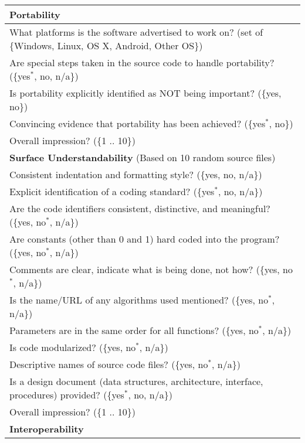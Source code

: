 \begin{longtable}{p{16cm}}
  \midrule
  \textbf{Portability}\\
  \midrule

  What platforms is the software advertised to work on?
  (set of \{Windows, Linux, OS X, Android, Other OS\})\\
  Are special steps taken in the source code to handle portability? (\{yes$^*$,
  no, n/a\}) \\
  Is portability explicitly identified as NOT being important? (\{yes, no\})\\
  Convincing evidence that portability has been achieved? (\{yes$^*$, no\})\\
  Overall impression? (\{1 .. 10\})\\

  \midrule
  \textbf{Surface Understandability} (Based on 10 random source files)\\
  \midrule

  Consistent indentation and formatting style? (\{yes, no, n/a\})\\
  Explicit identification of a coding standard? (\{yes$^*$, no, n/a\})\\
  Are the code identifiers consistent, distinctive, and
  meaningful? (\{yes, no$^*$, n/a\})\\
  Are constants (other than 0 and 1) hard coded into the program? (\{yes, no$^*$, n/a\})\\
  Comments are clear, indicate what is being done, not how? (\{yes, no$^*$, n/a\})\\
  Is the name/URL of any algorithms used mentioned?
  (\{yes, no$^*$, n/a\})\\
  Parameters are in the same order for all functions? (\{yes, no$^*$, n/a\})\\
  Is code modularized? (\{yes, no$^*$, n/a\})\\
  Descriptive names of source code files? (\{yes, no$^*$, n/a\})\\
  Is a design document (data structures, architecture, interface, procedures) provided? (\{yes$^*$, no, n/a\})\\
  Overall impression? (\{1 .. 10\})\\

  \midrule
  \textbf{Interoperability}\\
  \midrule


\end{longtable}
